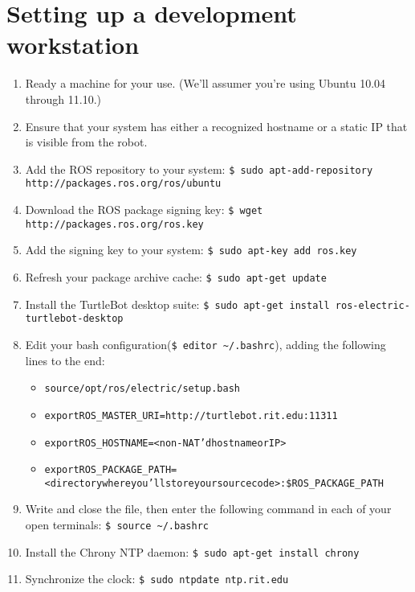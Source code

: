 \documentclass{article}
\begin{document}
\section{Setting up a development workstation}
\begin{enumerate}
\item{Ready a machine for your use.  (We'll assumer you're using Ubuntu 10.04 through 11.10.)}
\item{Ensure that your system has either a recognized hostname or a static IP that is visible from the robot.}
\item{Add the ROS repository to your system: \texttt{\$\ sudo apt-add-repository http://packages.ros.org/ros/ubuntu}}
\item{Download the ROS package signing key: \texttt{\$\ wget http://packages.ros.org/ros.key}}
\item{Add the signing key to your system: \texttt{\$\ sudo apt-key add ros.key}}
\item{Refresh your package archive cache: \texttt{\$\ sudo apt-get update}}
\item{Install the TurtleBot desktop suite: \texttt{\$\ sudo apt-get install ros-electric-turtlebot-desktop}}
\item{Edit your bash configuration(\texttt{\$\ editor \~{}/.bashrc}), adding the following lines to the end:}
\begin{alltt}\begin{itemize}
\item{source /opt/ros/electric/setup.bash}
\item{export ROS\_MASTER\_URI=http://turtlebot.rit.edu:11311}
\item{export ROS\_HOSTNAME=<non-NAT'd hostname or IP>}
\item{export ROS\_PACKAGE\_PATH=<directory where you'll store your source code>:\$ROS\_PACKAGE\_PATH}
\end{itemize}\end{alltt}
\item{Write and close the file, then enter the following command in each of your open terminals: \texttt{\$\ source \~{}/.bashrc}}
\item{Install the Chrony NTP daemon: \texttt{\$\ sudo apt-get install chrony}}
\item{Synchronize the clock: \texttt{\$\ sudo ntpdate ntp.rit.edu}}
\end{enumerate}
\end{document}
